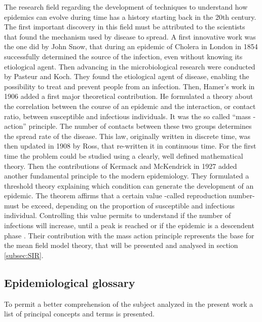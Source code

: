 The research field regarding the development of techniques to understand how epidemics can evolve during time has a history starting back in the 20th century. The first important discovery in this field must be attributed to the scientists that found the mechanism used by disease to spread. 
A first innovative work was the one did by John Snow, that during an epidemic of Cholera in London in 1854 successfully determined the source of the infection, even without knowing its etiological agent. Then advancing in the microbiological research were conducted by Pasteur and Koch. They found the etiological agent of disease, enabling the possibility to treat and prevent people from an infection. 
Then, Hamer's work in 1906 added a first major theoretical contribution. He formulated a theory about the correlation between the course of an epidemic and the interaction, or contact ratio, between susceptible and infectious individuals. It was the so called “mass -action” principle. The number of contacts between these two groups determines the spread rate of the disease. 
This law, originally written in discrete time, was then updated in 1908 by Ross, that re-written it  in continuous time. For the first time the problem could be studied using a clearly, well defined mathematical theory. Then the contributions of Kermack and McKendrick in 1927 added another fundamental principle to the modern epidemiology. They formulated a threshold theory explaining which condition can generate the development of an epidemic. The theorem affirms that a certain value -called reproduction number- must be exceed, depending on the proportion of susceptible and infectious individual. Controlling this value permits to understand if the number of infections will increase, until a peak is reached or if the epidemic is a descendent phase \cite{Mata2021, Anderson_82}. 
Their contribution with the mass action principle represents the base for the mean field model theory, that will be presented and analysed in section \ref{subsec:SIR}. 



\subsection{Epidemiological glossary}
\label{subsec:glossary}
To permit a better comprehension of the subject analyzed in the present work a list of principal concepts and terms is presented. 

